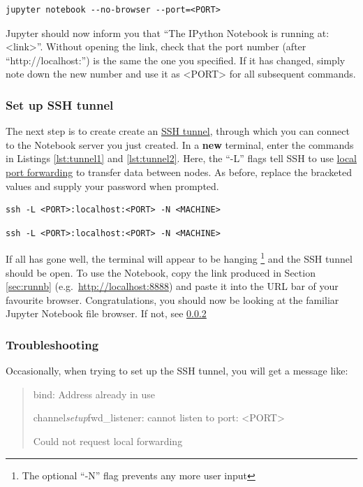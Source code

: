 \documentclass[a4paper]{article}
\begin{document}
\begin{lstlisting}[caption={Run Notebook server}, label={lst:runnb}]
jupyter notebook --no-browser --port=<PORT>
\end{lstlisting}

Jupyter should now inform you that ``The IPython Notebook is running at: \textless{}link\textgreater{}''.
Without opening the link, check that the port number (after ``http://localhost:'') is the same the one you specified.
If it has changed, simply note down the new number and use it as \textless{}PORT\textgreater{} for all subsequent commands.

\subsubsection{Set up SSH tunnel}
\label{sec:tunnel}
The next step is to create create an \href{http://blog.trackets.com/2014/05/17/ssh-tunnel-local-and-remote-port-forwarding-explained-with-examples.html}{SSH tunnel}, through which you can connect to the Notebook server you just created.
In a \textbf{new} terminal, enter the commands in Listings \ref{lst:tunnel1} and \ref{lst:tunnel2}.
Here, the ``-L'' flags tell SSH to use \href{https://help.ubuntu.com/community/SSH/OpenSSH/PortForwarding}{local port forwarding} to transfer data between nodes. 
As before, replace the bracketed values and supply your password when prompted.

\begin{lstlisting}[caption={Tunnel to gateway server}, label={lst:tunnel1}]
ssh -L <PORT>:localhost:<PORT> -N <MACHINE>
\end{lstlisting}

\begin{lstlisting}[caption={Tunnel to machine}, label={lst:tunnel2}]
ssh -L <PORT>:localhost:<PORT> -N <MACHINE>
\end{lstlisting}

If all has gone well, the terminal will appear to be hanging \footnote{The optional ``-N'' flag prevents any more user input} and the SSH tunnel should be open.
To use the Notebook, copy the link produced in Section \ref{sec:runnb} (e.g.~\url{http://localhost:8888}) and paste it into the URL bar of your favourite browser. 
Congratulations, you should now be looking at the familiar Jupyter Notebook file browser. If not, see \ref{sec:trouble} 

\subsubsection{Troubleshooting}
\label{sec:trouble}
Occasionally, when trying to set up the SSH tunnel, you will get a message like:
\begin{quote}
bind: Address already in use

channel\emph{setup}fwd\_listener: cannot listen to port: \textless{}PORT\textgreater{}

Could not request local forwarding
\end{quote}
\end{document}

